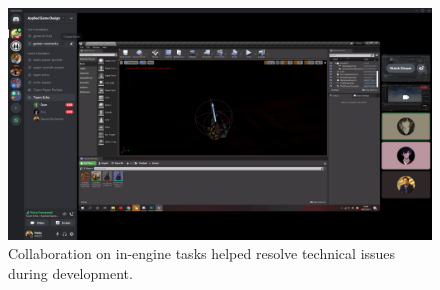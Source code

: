 \begin{figure}[h!]
    \centering
    \includegraphics[width=\linewidth]{Figures/CollaborativeEffort.png}
    \caption{Collaboration on in-engine tasks helped resolve technical issues during development.}
\end{figure}